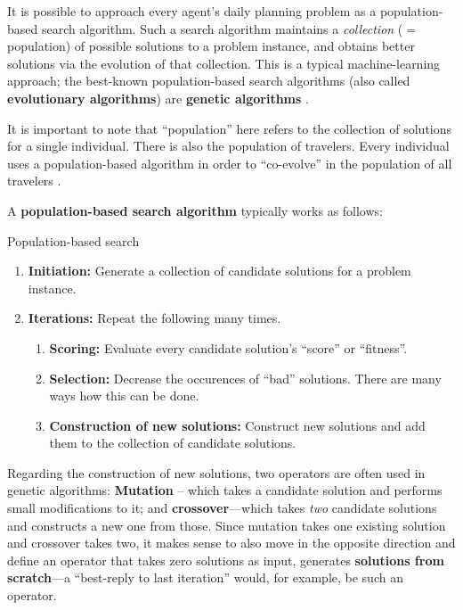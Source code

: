It is possible to approach every agent's daily
planning problem as a population-based search algorithm.  Such a
search algorithm maintains a \emph{collection} ($=$ population) of
possible solutions to a problem instance, and obtains better solutions
via the evolution of that collection.  This is a typical
machine-learning \citep[e.g.][]{RussellNorvigBook} approach; the best-known
population-based search algorithms (also called \textbf{evolutionary
algorithms}) are \textbf{genetic algorithms} \citep[e.g.,][]{GoldbergBook}.

It is important to note that ``population'' here refers to the
collection of solutions for a single individual.  There is also the
population of travelers.  Every individual uses a population-based
algorithm in order to ``co-evolve'' in the population of all
travelers \citep[also see][]{Balmer2007phd}.

A \textbf{population-based search algorithm} typically works as
follows:
\begin{algorithm}[H]

\caption{Population-based search}

\begin{enumerate}

\item \textbf{Initiation:} Generate a collection of candidate
  solutions for a problem instance.

\item \textbf{Iterations:} Repeat the following many times.

\begin{enumerate}

\item \textbf{Scoring:} Evaluate every candidate solution's ``score''
  or ``fitness''.

\item \textbf{Selection:} Decrease the occurences of ``bad''
  solutions.  There are many ways how this can be done.

\item \textbf{Construction of new solutions:} Construct new solutions
  and add them to the collection of candidate solutions.

\end{enumerate}

\end{enumerate}

\end{algorithm}

Regarding the construction of new solutions, two operators are often
used in genetic algorithms: \textbf{Mutation} -- which takes a
candidate solution and performs small modifications to it; and
\textbf{crossover}---which takes \emph{two} candidate solutions and
constructs a new one from those.  Since mutation takes one existing
solution and crossover takes two, it makes sense to also move in the
opposite direction and define an operator that takes zero solutions as
input, \ie generates \textbf{solutions from scratch}---a
``best-reply to last iteration'' would, for example, be such an
operator.

